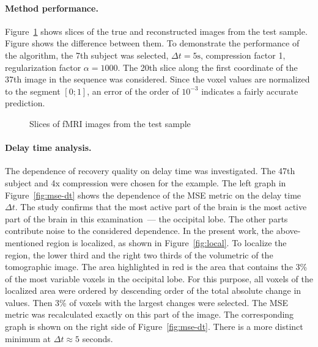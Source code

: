 \documentclass{article}
\begin{document}
\paragraph*{Method performance.}

Figure~\ref*{fig:example} shows slices of the true and reconstructed images from the test sample.
Figure shows the difference between them.
To demonstrate the performance of the algorithm, the 7th subject was selected, $\Delta t = 5 \text{s}$, compression factor 1, regularization factor
$\alpha = 1000$. The 20th slice along the first coordinate of the 37th image in the sequence was considered.
Since the voxel values are normalized to the segment $[0; 1]$, an error of the order of $10^{-3}$
indicates a fairly accurate prediction.

\begin{figure}[h!]
	\centering
	\hfill
	\hfill
	\caption{Slices of fMRI images from the test sample}
	\label{fig:example}
\end{figure}

\paragraph*{Delay time analysis.}

The dependence of recovery quality on delay time was investigated.
The 47th subject and 4x compression were chosen for the example.
The left graph in Figure~\ref{fig:mse-dt} shows the dependence of the MSE metric
on the delay time $\Delta t$.
The study confirms that the most active part of the brain is the most active part of the brain 
in this examination~--- the occipital lobe.
The other parts contribute noise to the considered dependence.
In the present work, the above-mentioned region is localized, 
as shown in Figure~\ref{fig:local}.
To localize the region, the lower third and the right two thirds of the volumetric
of the tomographic image.
The area highlighted in red is the area that contains the 3\% 
of the most variable voxels in the occipital lobe.
For this purpose, all voxels of the localized area were ordered by 
descending order of the total absolute change in values.
Then 3\% of voxels with the largest changes were selected.
The MSE metric was recalculated exactly on this part of the image.
The corresponding graph is shown on the right side of Figure~\ref{fig:mse-dt}.
There is a more distinct minimum at $\Delta t \approx 5$ seconds.
\end{document}
